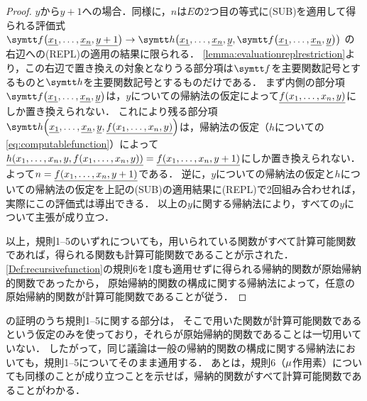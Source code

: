 \begin{proof}
	\(y\)から\(y + 1\)への場合．同様に，\(n\)は\(E\)の2つ目の等式に(SUB)を適用して得られる評価式
	\(\apply{\obj{f}}{\numeral{x_1}, \dots, \numeral{x_n}, \numeral{y+1}} \evaluate \apply{\obj{h}}{\numeral{x_1}, \dots, \numeral{x_n}, \numeral{y}, \apply{\obj{f}}{\numeral{x_1}, \dots, \numeral{x_n}, \numeral{y}}}\)
	の右辺への(REPL)の適用の結果に限られる．
	\cref{lemma:evaluationreplrestriction}より，この右辺で置き換えの対象となりうる部分項は\(\obj{f}\)を主要関数記号とするものと\(\obj{h}\)を主要関数記号とするものだけである．
	まず内側の部分項\(\apply{\obj{f}}{\numeral{x_1}, \dots, \numeral{x_n}, \numeral{y}}\)は，\(y\)についての帰納法の仮定によって\(\numeral{\apply{f}{x_1, \dots, x_n, y}}\)にしか置き換えられない．
	これにより残る部分項\(\apply{\obj{h}}{\numeral{x_1}, \dots, \numeral{x_n}, \numeral{y}, \numeral{\apply{f}{x_1, \dots, x_n, y}}}\)は，帰納法の仮定（\(h\)についての\cref{eq:computablefunction}）によって\(\numeral{\apply{h}{x_1, \dots, x_n, y, \apply{f}{x_1, \dots, x_n, y}}} = \numeral{\apply{f}{x_1, \dots, x_n, y+1}}\)にしか置き換えられない．
	よって\(n = \numeral{\apply{f}{x_1, \dots, x_n, y+1}}\)である．
	逆に，\(y\)についての帰納法の仮定と\(h\)についての帰納法の仮定を上記の(SUB)の適用結果に(REPL)で2回組み合わせれば，実際にこの評価式は導出できる．
	以上の\(y\)に関する帰納法により，すべての\(y\)について主張が成り立つ．

	以上，規則1--5のいずれについても，用いられている関数がすべて計算可能関数であれば，得られる関数も計算可能関数であることが示された．
	\cref{Def:recursivefunction}の規則6を1度も適用せずに得られる帰納的関数が原始帰納的関数であったから，
	原始帰納的関数の構成に関する帰納法によって，任意の原始帰納的関数が計算可能関数であることが従う．
\end{proof}

の証明のうち規則1--5に関する部分は，
そこで用いた関数が計算可能関数であるという仮定のみを使っており，それらが原始帰納的関数であることは一切用いていない．
したがって，同じ議論は一般の帰納的関数の構成に関する帰納法においても，規則1--5についてそのまま通用する．
あとは，規則6（\(\mu\)作用素）についても同様のことが成り立つことを示せば，帰納的関数がすべて計算可能関数であることがわかる．


